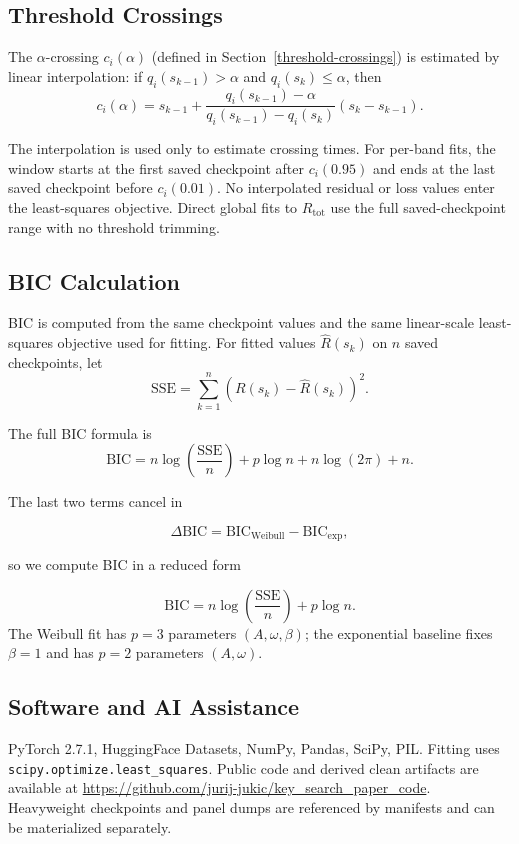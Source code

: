 \documentclass{article}
\begin{document}
\subsection{Threshold Crossings}\label{app:crossings}
The $\alpha$-crossing $c_i(\alpha)$ (defined in
Section~\ref{threshold-crossings}) is estimated by linear interpolation:
if $q_i(s_{k-1})>\alpha$ and $q_i(s_k)\leq\alpha$, then
\[
c_i(\alpha)
=s_{k-1}
+\frac{q_i(s_{k-1})-\alpha}{q_i(s_{k-1})-q_i(s_k)}
\left(s_k-s_{k-1}\right).
\]

The interpolation is used only to estimate crossing times. For per-band
fits, the window starts at the first saved checkpoint after \(c_i(0.95)\) and ends at the
last saved checkpoint before \(c_i(0.01)\). No interpolated residual or
loss values enter the least-squares objective. Direct global fits to
\(R_{\mathrm{tot}}\) use the full saved-checkpoint range with no
threshold trimming.

\subsection{BIC Calculation}\label{app:bic-calculation}

BIC is computed from the same checkpoint values and the same
linear-scale least-squares objective used for fitting. For fitted values
\(\widehat R(s_k)\) on \(n\) saved checkpoints, let
\[
\mathrm{SSE}=\sum_{k=1}^{n}\left(R(s_k)-\widehat R(s_k)\right)^2.
\]

The full BIC formula is
\[
\mathrm{BIC}
=
n\log\!\left(\frac{\mathrm{SSE}}{n}\right)
+ p\log n
+ n\log(2\pi) + n.
\]

The last two terms cancel in

\[
\Delta\mathrm{BIC}
=
\mathrm{BIC}_{\mathrm{Weibull}}
-
\mathrm{BIC}_{\mathrm{exp}},
\]

so we compute BIC in a reduced form

\[
\mathrm{BIC}
=
n\log\!\left(\frac{\mathrm{SSE}}{n}\right)
+ p\log n.
\]
The Weibull fit has $p=3$ parameters $(A,\omega,\beta)$; the exponential
baseline fixes $\beta=1$ and has $p=2$ parameters $(A,\omega)$.

\subsection{Software and AI Assistance}\label{app:software}

PyTorch 2.7.1, HuggingFace Datasets, NumPy, Pandas, SciPy, PIL. Fitting
uses \texttt{scipy.optimize.}\allowbreak\texttt{least\_squares}.
Public code and derived clean artifacts are available at
\url{https://github.com/jurij-jukic/key_search_paper_code}.
Heavyweight checkpoints and panel dumps are referenced by manifests and
can be materialized separately.
\end{document}
